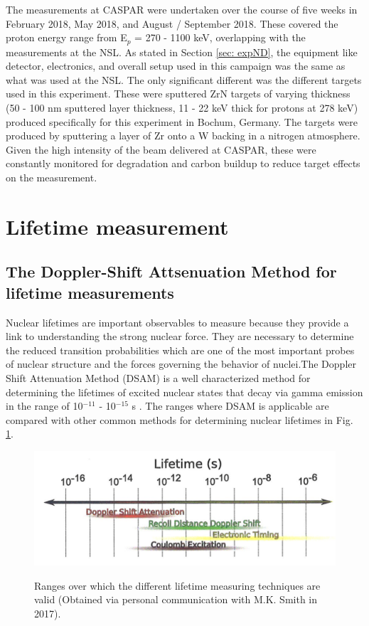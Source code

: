 The measurements at CASPAR were undertaken over the course of five weeks in February 2018, May 2018, and August / September 2018. These covered the proton energy range from E$_{p}$ = 270 - 1100 keV, overlapping with the measurements at the NSL. As stated in Section \ref{sec: expND}, the equipment like detector, electronics, and overall setup used in this campaign was the same as what was used at the NSL. The only significant different was the different targets used in this experiment. These were sputtered ZrN targets of varying thickness (50 - 100 nm sputtered layer thickness, 11 - 22 keV thick for protons at 278 keV) produced specifically for this experiment in Bochum, Germany. The targets were produced by sputtering a layer of Zr onto a W backing in a nitrogen atmosphere. Given the high intensity of the beam delivered at CASPAR, these were constantly monitored for degradation and carbon buildup to reduce target effects on the measurement. 





\section{Lifetime measurement}
\label{sec: lifetime experiment}

\subsection{The Doppler-Shift Attsenuation Method for lifetime measurements}
\label{sec: DSAM}


Nuclear lifetimes are important observables to measure because they provide a link to understanding the strong nuclear force. They are necessary to determine the reduced transition probabilities which are one of the most important probes of nuclear structure and the forces governing the behavior of nuclei.The Doppler Shift Attenuation Method (DSAM) is a well characterized method for determining the lifetimes of excited nuclear states that decay via gamma emission in the range of 10$^{-11}$ - 10$^{-15}$ s \cite{Blaugrund1966}. The ranges where DSAM is applicable are compared with other common methods for determining nuclear lifetimes in Fig. \ref{fig: lifetimeRanges}. 


\begin{figure}
\includegraphics[width=\linewidth]{figures/lifetimeTechniques.png}
\label{fig: lifetimeRanges}
\caption{Ranges over which the different lifetime measuring techniques are valid (Obtained via personal communication with M.K. Smith in 2017).}
\end{figure}


